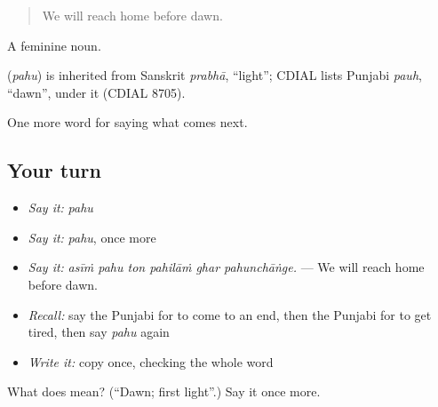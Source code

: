 \begin{quote}
We will reach home before dawn.
\end{quote}

A feminine noun.

\begin{cousinweb}
\textbf{} (\emph{pahu}) is inherited from Sanskrit \emph{prabhā}, \textquotedblleft{}light\textquotedblright{}; CDIAL lists Punjabi \emph{pauh}, \textquotedblleft{}dawn\textquotedblright{}, under it (CDIAL 8705).
\end{cousinweb}

\begin{grammarlens}[title={What you've built}]
One more word for saying what comes next.
\end{grammarlens}

\subsection*{Your turn}
\begin{itemize}
\raggedright
  \item \emph{Say it:} \emph{pahu}
  \item \emph{Say it:} \emph{pahu}, once more
  \item \emph{Say it:} \emph{asīṁ pahu ton pahilāṁ ghar pahunchāṅge.} — We will reach home before dawn.
  \item \emph{Recall:} say the Punjabi for to come to an end, then the Punjabi for to get tired, then say \emph{pahu} again
  \item \emph{Write it:} copy \textbf{} once, checking the whole word
\end{itemize}

\begin{tcolorbox}[breakable,colback=teal!4,colframe=teal!35!black,title={Before you move on}]
What does  mean? (\textquotedblleft{}Dawn; first light\textquotedblright{}.) Say it once more.
\end{tcolorbox}
